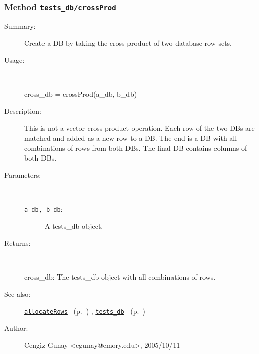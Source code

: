 \subsubsection[Method \texttt{crossProd}]{Method \texttt{tests\_db/crossProd}}%
%
\label{ref_tests_db__crossProd}%
\hypertarget{ref_tests_db__crossProd}{}%
\begin{description}
\item[Summary:]Create a DB by taking the cross product of two database row sets.
%
\item[Usage:]~%
\begin{lyxcode}%
cross\_db = crossProd(a\_db, b\_db)
%
\end{lyxcode}%
%
\item[Description:]%
This is not a vector cross product operation. Each row of the two DBs are matched 
 and added as a new row to a DB. The end is a DB with all combinations 
 of rows from both DBs. The final DB contains columns of both DBs.
\item[Parameters:]~
\begin{description}%
\item[\texttt{a\_db, b\_db}:]
 A tests\_db object.
\end{description}%
%
\item[Returns:
]~

	cross\_db: The tests\_db object with all combinations of rows.
%
%
\item[See also:]%
\hyperlink{ref_allocateRows}{\texttt{allocateRows}}%
\ (p.~\pageref{ref_allocateRows})%
%
, \hyperlink{ref_tests_db}{\texttt{tests\_db}}%
\ (p.~\pageref{ref_tests_db})%
%
%
\item[Author:]%
Cengiz Gunay <cgunay@emory.edu>, 2005/10/11
%
\end{description}
\methodline%
